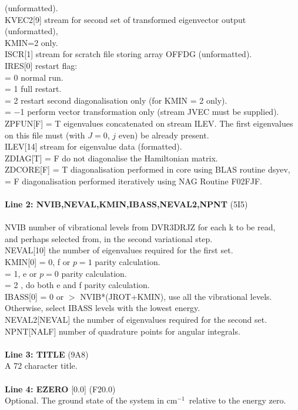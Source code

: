 \documentclass{elsart}
\def\cm{{cm$^{-1}$}}
\begin{document}
\begin{tabbing}
(unformatted).\\
KVEC2[9] \> stream for second set of transformed eigenvector output
(unformatted),\\
\> KMIN=2 only.\\
ISCR[1] \> stream for scratch file storing array OFFDG (unformatted).\\
IRES[0] \> restart flag:\\
        \> = 0 normal run.\\
        \> = 1 full restart.\\
        \> = 2 restart second diagonalisation only (for KMIN = 2 only).\\
        \> = $-$1 perform vector transformation only (stream JVEC must be
supplied).\\
ZPFUN[F]\> = T eigenvalues concatenated on stream ILEV. The first
eigenvalues \\ \> on this file must (with $J=0$, $j$ even) be already
present.\\
ILEV[14] \> stream for eigenvalue data (formatted).\\
ZDIAG[T] \> = F do not diagonalise the Hamiltonian matrix.\\
ZDCORE[F]\> = T diagonalisation performed in core using BLAS routine dsyev,\\
         \> = F diagonalisation performed iteratively using NAG Routine
F02FJF.\\
\\
{\bf Line 2: NVIB,NEVAL,KMIN,IBASS,NEVAL2,NPNT} (5I5)\\
\\
NVIB \> number of vibrational levels from DVR3DRJZ for each k to be read,\\
\> and perhaps selected from, in the second variational step.\\
NEVAL[10] \> the number of eigenvalues required for the first set.\\
KMIN[0] \> = 0, f or $p = 1$ parity calculation.\\
        \> = 1, e or $p = 0$ parity calculation.\\
        \> = 2 , do both e and f parity calculation.\\
IBASS[0] \> = 0 or $>$ NVIB*(JROT+KMIN), use all the vibrational levels.\\
        \> Otherwise, select IBASS levels with the lowest energy.\\
NEVAL2[NEVAL] the number of eigenvalues required for the second set.\\
NPNT[NALF] number of quadrature points for angular integrals.\\
\\
{\bf Line 3: TITLE} (9A8)\\
A 72 character title.\\
\\
{\bf Line 4: EZERO} [0.0] (F20.0)\\
Optional. The ground state of the system in \cm\ relative to the energy zero.\\
\end{tabbing}
\end{document}
